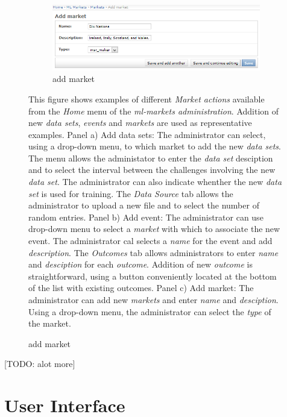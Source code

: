 \documentclass[bsc,frontabs,twoside,singlespacing,parskip,deptreport]{infthesis}     %
\begin{document}
\begin{itemize}
\begin{figure}
\begin{subfigure}{.8\textwidth}

  \includegraphics[width=1\linewidth]{figures/admin-market-add(1).png}
  \caption{add market}
  \label{fig:add-market}
\end{subfigure}
\label{fig:market-actions}

{This figure shows examples of different {\it Market actions} available from the {\it Home} menu of the {\it ml-markets administration}. Addition of new {\it data sets}, {\it events} and {\it markets} are used as representative examples. Panel a) Add data sets: The administrator can select, using a drop-down menu, to which market to add the new {\it data sets}. The menu allows the administator to enter the {\it data set} desciption and to select the interval between the challenges involving the new {\it data set}. The administrator can also indicate whenther the new {\it data set} is used for training. The {\it Data Source} tab allows the administrator to upload a new file and to select the number of random entries. Panel b) Add event: The administrator can use drop-down menu to select a {\it market} with which to associate the new event. The administrator cal selects a {\it name} for the event and add {\it description}. The {\it Outcomes} tab allows administrators to enter {\it name} and {\it desciption} for each {\it outcome}. Addition of new {\it outcome} is straightforward, using a button conveniently located at the bottom of the list with existing outcomes. Panel c) Add market: The administrator can add new {\it markets} and enter {\it name} and {\it desciption}. Using a drop-down menu, the administrator can select the {\it type} of the market.}  
\end{figure}



[TODO: alot more]
\section{User Interface}

\begin{figure}
\caption{User login and index}
\begin{subfigure}{.5\textwidth}


\end{subfigure}
\end{figure}
\end{itemize}
\end{document}
